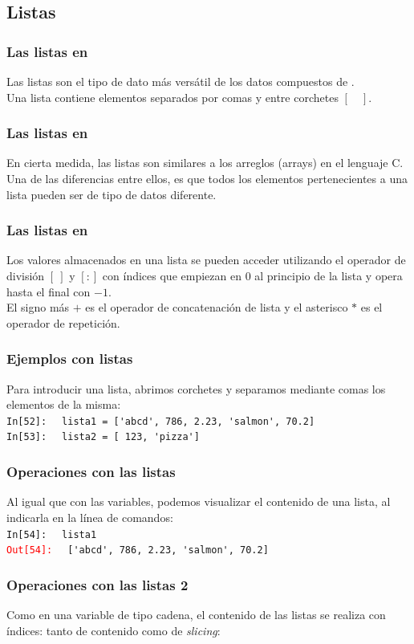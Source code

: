 {\subsection{Listas}
\begin{frame}
\frametitle{Las listas en \python}
Las listas son el tipo de dato más versátil de los datos compuestos de \python.
\\
\bigskip
Una lista contiene elementos separados por comas y entre corchetes $[ \quad ]$.
\end{frame}
\begin{frame}
\frametitle{Las listas en \python}
En cierta medida, las listas son similares a los arreglos (arrays) en el lenguaje C.
\\
\bigskip
Una de las diferencias entre ellos, es que todos los elementos pertenecientes a una lista pueden ser de tipo de datos diferente.
\end{frame}
\begin{frame}
\frametitle{Las listas en \python}
Los valores almacenados en una lista se pueden acceder utilizando el operador de división $[ \: ]$ y $[:]$ con índices que empiezan en $0$ al principio de la lista y opera hasta el final con $-1$.
\\
\bigskip
El signo más $+$ es el operador de concatenación de lista y el asterisco $*$ es el operador de repetición.
\end{frame}
\begin{frame}[fragile]
\frametitle{Ejemplos con listas}
Para introducir una lista, abrimos corchetes y separamos mediante comas los elementos de la misma:
\\
\pause
\textcolor{ao}{\texttt{In[52]: }} \verb| lista1 = ['abcd', 786, 2.23, 'salmon', 70.2]|
\\
\textcolor{ao}{\texttt{In[53]: }} \verb| lista2 = [ 123, 'pizza']|
\end{frame}
\begin{frame}[fragile]
\frametitle{Operaciones con las listas}
Al igual que con las variables, podemos visualizar el contenido de una lista, al indicarla en la línea de comandos:
\\
\bigskip
\textcolor{ao}{\texttt{In[54]: }} \verb| lista1|
\\
\pause
\textcolor{red}{\texttt{Out[54]: }} \verb| ['abcd', 786, 2.23, 'salmon', 70.2]|
\end{frame}
\begin{frame}[fragile]
\frametitle{Operaciones con las listas 2}
Como en una variable de tipo cadena, el contenido de las listas se realiza con índices: tanto de contenido como de \emph{slicing}:

\end{frame}}
